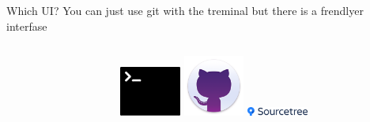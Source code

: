 \documentclass[10pt]{beamer}
\begin{document}
\begin{frame}[fragile]{Which UI?}
You can just use git with the treminal but there is a frendlyer interfase\\
  \begin{columns}[T]
    \begin{column}{.8\textwidth}
    \end{column}
    \begin{column}{.2\textwidth}
	\includegraphics[width=2cm]{Figs/git/terminal} \newline  \newline   \newline 
	\includegraphics[width=2cm]{Figs/git/gitdesktop} \newline  \newline   \newline 
	\includegraphics[width=2cm]{Figs/git/Sourcetree}
    \end{column}
  \end{columns}
\end{frame}
\end{document}
